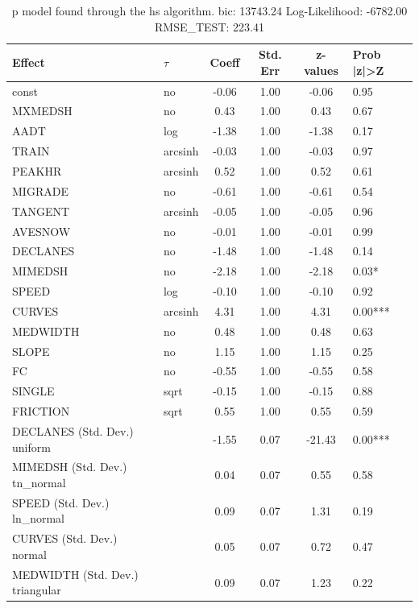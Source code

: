 \begin{table}
	\caption{p model found through the hs algorithm. bic: 13743.24 Log-Likelihood: -6782.00 RMSE_TEST: 223.41}
	\begin{center}
		\begin{tabular}{|l|l|c|c|c|l|}
			\hline
			Effect & $\tau$ & Coeff & Std. Err & z-values & Prob |z|>Z \\
			\hline
			const & no & -0.06 & 1.00 & -0.06 & 0.95 \\
			\hline
			MXMEDSH & no & 0.43 & 1.00 & 0.43 & 0.67 \\
			\hline
			AADT & log & -1.38 & 1.00 & -1.38 & 0.17 \\
			\hline
			TRAIN & arcsinh & -0.03 & 1.00 & -0.03 & 0.97 \\
			\hline
			PEAKHR & arcsinh & 0.52 & 1.00 & 0.52 & 0.61 \\
			\hline
			MIGRADE & no & -0.61 & 1.00 & -0.61 & 0.54 \\
			\hline
			TANGENT & arcsinh & -0.05 & 1.00 & -0.05 & 0.96 \\
			\hline
			AVESNOW & no & -0.01 & 1.00 & -0.01 & 0.99 \\
			\hline
			DECLANES & no & -1.48 & 1.00 & -1.48 & 0.14 \\
			\hline
			MIMEDSH & no & -2.18 & 1.00 & -2.18 & 0.03* \\
			\hline
			SPEED & log & -0.10 & 1.00 & -0.10 & 0.92 \\
			\hline
			CURVES & arcsinh & 4.31 & 1.00 & 4.31 & 0.00*** \\
			\hline
			MEDWIDTH & no & 0.48 & 1.00 & 0.48 & 0.63 \\
			\hline
			SLOPE & no & 1.15 & 1.00 & 1.15 & 0.25 \\
			\hline
			FC & no & -0.55 & 1.00 & -0.55 & 0.58 \\
			\hline
			SINGLE & sqrt & -0.15 & 1.00 & -0.15 & 0.88 \\
			\hline
			FRICTION & sqrt & 0.55 & 1.00 & 0.55 & 0.59 \\
			\hline
			DECLANES (Std. Dev.) uniform &  & -1.55 & 0.07 & -21.43 & 0.00*** \\
			\hline
			MIMEDSH (Std. Dev.) tn_normal &  & 0.04 & 0.07 & 0.55 & 0.58 \\
			\hline
			SPEED (Std. Dev.) ln_normal &  & 0.09 & 0.07 & 1.31 & 0.19 \\
			\hline
			CURVES (Std. Dev.) normal &  & 0.05 & 0.07 & 0.72 & 0.47 \\
			\hline
			MEDWIDTH (Std. Dev.) triangular &  & 0.09 & 0.07 & 1.23 & 0.22 \\

\end{tabular}
\end{center}
\end{table}
